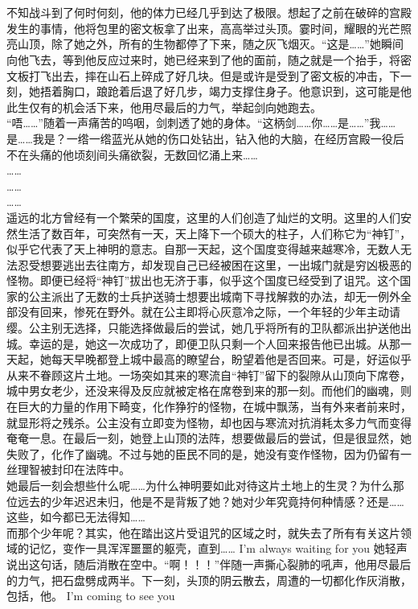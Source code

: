 \documentclass[a4paper]{article}
\begin{document}
	\section{}
		不知战斗到了何时何刻，他的体力已经几乎到达了极限。想起了之前在破碎的宫殿发生的事情，他将包里的密文板拿了出来，高高举过头顶。霎时间，耀眼的光芒照亮山顶，除了她之外，所有的生物都停了下来，随之灰飞烟灭。“这是……”她瞬间向他飞去，等到他反应过来时，她已经来到了他的面前，随之就是一个抬手，将密文板打飞出去，摔在山石上碎成了好几块。但是或许是受到了密文板的冲击，下一刻，她捂着胸口，踉跄着后退了好几步，竭力支撑住身子。他意识到，这可能是他此生仅有的机会活下来，他用尽最后的力气，举起剑向她跑去。\\
		\indent “唔……”随着一声痛苦的呜咽，剑刺透了她的身体。“这柄剑……你……是……”我……是……我是？一绺一绺蓝光从她的伤口处钻出，钻入他的大脑，在经历宫殿一役后不在头痛的他顷刻间头痛欲裂，无数回忆涌上来……\\
		\indent ……\\
		\indent ……\\
		\indent ……\\
		\indent 遥远的北方曾经有一个繁荣的国度，这里的人们创造了灿烂的文明。这里的人们安然生活了数百年，可突然有一天，天上降下一个硕大的柱子，人们称它为“神钉”，似乎它代表了天上神明的意志。自那一天起，这个国度变得越来越寒冷，无数人无法忍受想要逃出去往南方，却发现自己已经被困在这里，一出城门就是穷凶极恶的怪物。即便已经将“神钉”拔出也无济于事，似乎这个国度已经受到了诅咒。这个国家的公主派出了无数的士兵护送骑士想要出城南下寻找解救的办法，却无一例外全部没有回来，惨死在野外。就在公主即将心灰意冷之际，一个年轻的少年主动请缨。公主别无选择，只能选择做最后的尝试，她几乎将所有的卫队都派出护送他出城。幸运的是，她这一次成功了，即便卫队只剩一个人回来报告他已出城。从那一天起，她每天早晚都登上城中最高的瞭望台，盼望着他是否回来。可是，好运似乎从来不眷顾这片土地。一场突如其来的寒流自“神钉”留下的裂隙从山顶向下席卷，城中男女老少，还没来得及反应就被定格在席卷到来的那一刻。而他们的幽魂，则在巨大的力量的作用下畸变，化作狰狞的怪物，在城中飘荡，当有外来者前来时，就显形将之残杀。公主没有立即变为怪物，却也因与寒流对抗消耗太多力气而变得奄奄一息。在最后一刻，她登上山顶的法阵，想要做最后的尝试，但是很显然，她失败了，化作了幽魂。不过与她的臣民不同的是，她没有变作怪物，因为仍留有一丝理智被封印在法阵中。\\
		\indent 她最后一刻会想些什么呢……为什么神明要如此对待这片土地上的生灵？为什么那位远去的少年迟迟未归，他是不是背叛了她？她对少年究竟持何种情感？还是……这些，如今都已无法得知……\\
		\indent 而那个少年呢？其实，他在踏出这片受诅咒的区域之时，就失去了所有有关这片领域的记忆，变作一具浑浑噩噩的躯壳，直到……
		\indent I'm always waiting for you
		\indent 她轻声说出这句话，随后消散在空中。“啊！！！”伴随一声撕心裂肺的吼声，他用尽最后的力气，把石盘劈成两半。下一刻，头顶的阴云散去，周遭的一切都化作灰消散，包括，他。
		\indent I'm coming to see you
\end{document}
